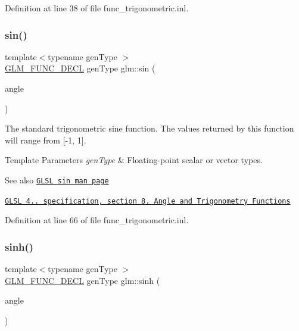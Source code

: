Definition at line 38 of file func\+\_\+trigonometric.\+inl.

\mbox{\label{group__core__func__trigonometric_gafbab21016b7f3bc21afb09a7e42e2df1}} 
\subsubsection{\texorpdfstring{sin()}{sin()}}
{\footnotesize\ttfamily template$<$typename gen\+Type $>$ \\
\hyperlink{setup_8hpp_ab2d052de21a70539923e9bcbf6e83a51}{G\+L\+M\+\_\+\+F\+U\+N\+C\+\_\+\+D\+E\+CL} gen\+Type glm\+::sin (\begin{DoxyParamCaption}\item[{gen\+Type const \&}]{angle }\end{DoxyParamCaption})}

The standard trigonometric sine function. The values returned by this function will range from \mbox{[}-\/1, 1\mbox{]}.


\begin{DoxyTemplParams}{Template Parameters}
{\em gen\+Type} & Floating-\/point scalar or vector types.\\
\hline
\end{DoxyTemplParams}
\begin{DoxySeeAlso}{See also}
\href{http://www.opengl.org/sdk/docs/manglsl/xhtml/sin.xml}{\tt G\+L\+SL sin man page} 

\href{http://www.opengl.org/registry/doc/GLSLangSpec.4.20.8.pdf}{\tt G\+L\+SL 4.. specification, section 8. Angle and Trigonometry Functions} 
\end{DoxySeeAlso}


Definition at line 66 of file func\+\_\+trigonometric.\+inl.

\mbox{\label{group__core__func__trigonometric_ga2e8c9a896e803661058de83429aa6eda}} 
\subsubsection{\texorpdfstring{sinh()}{sinh()}}
{\footnotesize\ttfamily template$<$typename gen\+Type $>$ \\
\hyperlink{setup_8hpp_ab2d052de21a70539923e9bcbf6e83a51}{G\+L\+M\+\_\+\+F\+U\+N\+C\+\_\+\+D\+E\+CL} gen\+Type glm\+::sinh (\begin{DoxyParamCaption}\item[{gen\+Type const \&}]{angle }\end{DoxyParamCaption})}

